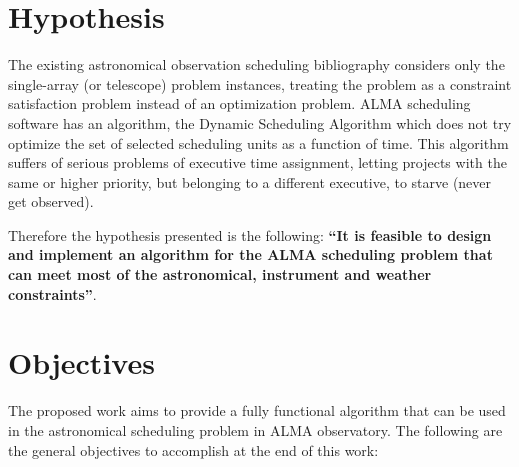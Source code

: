 \section{Hypothesis}
The existing astronomical observation scheduling bibliography considers only the single-array (or telescope) problem instances,
treating the problem as a constraint satisfaction problem instead of an optimization problem.
ALMA scheduling software has an algorithm, the Dynamic Scheduling Algorithm
which does not try optimize the set of selected scheduling units
as a function of time. This algorithm suffers of
serious problems of executive time assignment, letting projects 
with the same or higher priority, but belonging to a different executive, to starve (never get observed).

Therefore the hypothesis presented is the following:
\textbf{``It is feasible to design and implement an algorithm for the ALMA scheduling problem 
that can meet most of the astronomical, instrument and weather constraints''}.

\section{Objectives}
\label{sec:objectives}
The proposed work aims to provide a fully functional algorithm that can be used in the astronomical scheduling problem in ALMA observatory.
The following are the general objectives to accomplish at the end of this work:


